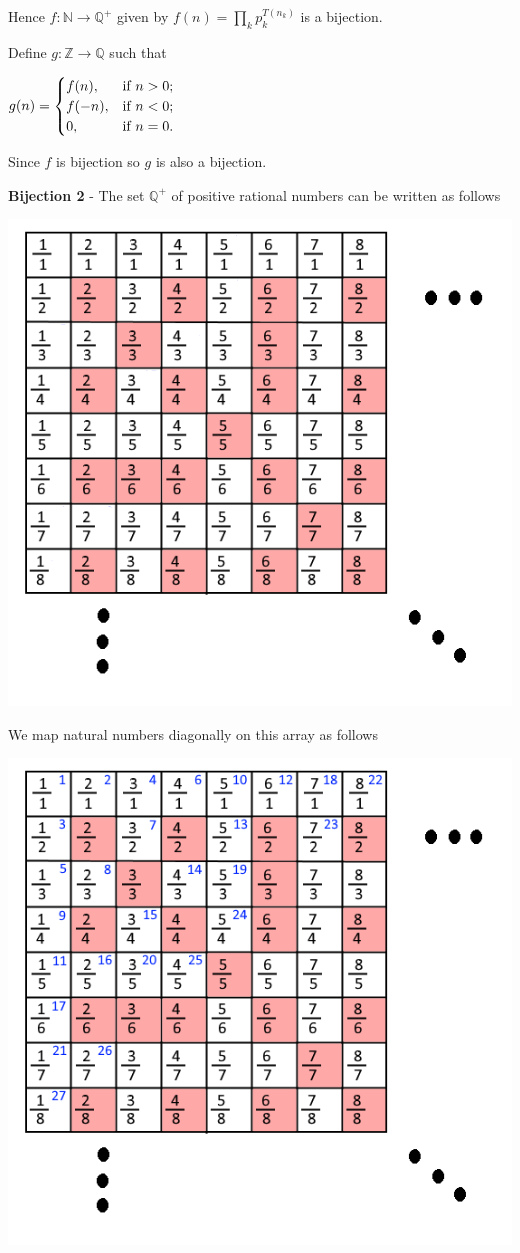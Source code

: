 \documentclass{article}
\begin{document}
    \qquad Hence $f: \mathbb{N}\rightarrow \mathbb{Q^+}$ given by $f(n)=\prod_{k}p_k^{T(n_k)}$ is a bijection.
    
    
    \qquad Define $g: \mathbb{Z} \rightarrow \mathbb{Q}$ such that
    
    \qquad $g(n)=
    \begin{cases}
        f(n), & \hbox{if $n>0$;} \\
        f(-n), & \hbox{if $n<0$;} \\
        0, & \hbox{if $n=0$.}
    \end{cases}$
    
    \qquad Since $f$ is bijection so $g$ is also a bijection. 
                
    \quad \textbf{Bijection 2} - The set $\mathbb{Q^+}$ of positive rational numbers can be written as follows

    \begin{center}
    \includegraphics[width=3.5 in]{Images/a1-q4-1.png}
    \end{center}
    
    \quad We map natural numbers diagonally on this array as follows
    
    \begin{center}
    \includegraphics[width=3.5 in]{Images/a1-q4-2.png}
    \end{center}
    
\end{document}

